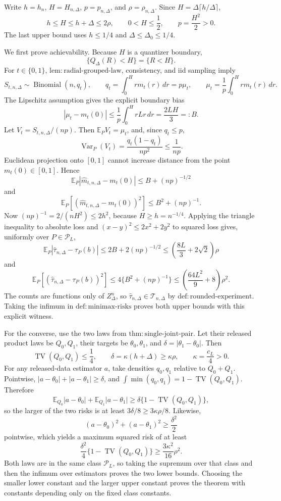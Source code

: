 Write \(h=h_n\), \(H=H_{n,\Delta}\), \(p=p_{n,\Delta}\), and \(\rho=\rho_{n,\Delta}\).  Since \(H=\Delta\lceil h/\Delta\rceil\),
\[
 h\le H\le h+\Delta\le2\rho,
 \qquad
 0<H\le\frac12,
 \qquad
 p=\frac{H^2}{2}>0.
\]
The last upper bound uses \(h\le1/4\) and \(\Delta\le\Delta_0\le1/4\).

We first prove achievability.  Because \(H\) is a quantizer boundary,
\[
 \{Q_\Delta(R)<H\}=\{R<H\}.
\]
For \(t\in\{0,1\}\), \(\mathrm{lem:radial\text{-}grouped\text{-}law}\), consistency, and iid sampling imply
\[
 S_{t,n,\Delta}\sim\operatorname{Binomial}(n,q_t),
 \qquad
 q_t=\int_0^H r m_t(r)\,dr=p\mu_t,
 \qquad
 \mu_t=\frac1p\int_0^H r m_t(r)\,dr.
\]
The Lipschitz assumption gives the explicit boundary bias
\[
 |\mu_t-m_t(0)|
 \le\frac1p\int_0^H rLr\,dr
 =\frac{2LH}{3}=:B.
\]
Let \(V_t=S_{t,n,\Delta}/(np)\).  Then \(\mathbb E_PV_t=\mu_t\), and, since \(q_t\le p\),
\[
 \operatorname{Var}_P(V_t)
 =\frac{q_t(1-q_t)}{np^2}
 \le\frac1{np}.
\]
Euclidean projection onto \([0,1]\) cannot increase distance from the point \(m_t(0)\in[0,1]\).  Hence
\[
 \mathbb E_P|\widehat m_{t,n,\Delta}-m_t(0)|
 \le B+(np)^{-1/2}
\]
and
\[
 \mathbb E_P[(\widehat m_{t,n,\Delta}-m_t(0))^2]
 \le B^2+(np)^{-1}.
\]
Now \((np)^{-1}=2/(nH^2)\le2h^2\), because \(H\ge h=n^{-1/4}\).  Applying the triangle inequality to absolute loss and \((x-y)^2\le2x^2+2y^2\) to squared loss gives, uniformly over \(P\in\mathcal P_L\),
\[
 \mathbb E_P|\widehat\tau_{n,\Delta}-\tau_P(b)|
 \le2B+2(np)^{-1/2}
 \le\left(\frac{8L}{3}+2\sqrt2\right)\rho
\]
and
\[
 \mathbb E_P[(\widehat\tau_{n,\Delta}-\tau_P(b))^2]
 \le4\{B^2+(np)^{-1}\}
 \le\left(\frac{64L^2}{9}+8\right)\rho^2.
\]
The counts are functions only of \(Z_\Delta^n\), so \(\widehat\tau_{n,\Delta}\in\mathcal T_{n,\Delta}\) by \(\mathrm{def:rounded\text{-}experiment}\).  Taking the infimum in \(\mathrm{def:minimax\text{-}risks}\) proves both upper bounds with this explicit witness.

For the converse, use the two laws from \(\mathrm{thm:single\text{-}joint\text{-}pair}\).  Let their released product laws be \(Q_0,Q_1\), their targets be \(\theta_0,\theta_1\), and \(\delta=|\theta_1-\theta_0|\).  Then
\[
 \operatorname{TV}(Q_0,Q_1)\le\frac14,
 \qquad
 \delta=\kappa(h+\Delta)\ge\kappa\rho,
 \qquad \kappa=\frac{c_L}{4}>0.
\]
For any released-data estimator \(a\), take densities \(q_0,q_1\) relative to \(Q_0+Q_1\).  Pointwise, \(|a-\theta_0|+|a-\theta_1|\ge\delta\), and \(\int\min(q_0,q_1)=1-\operatorname{TV}(Q_0,Q_1)\).  Therefore
\[
 \mathbb E_{Q_0}|a-\theta_0|+\mathbb E_{Q_1}|a-\theta_1|
 \ge\delta\{1-\operatorname{TV}(Q_0,Q_1)\},
\]
so the larger of the two risks is at least \(3\delta/8\ge3\kappa\rho/8\).  Likewise,
\[
 (a-\theta_0)^2+(a-\theta_1)^2\ge\frac{\delta^2}{2}
\]
pointwise, which yields a maximum squared risk of at least
\[
 \frac{\delta^2}{4}\{1-\operatorname{TV}(Q_0,Q_1)\}
 \ge\frac{3\kappa^2}{16}\rho^2.
\]
Both laws are in the same class \(\mathcal P_L\), so taking the supremum over that class and then the infimum over estimators proves the two lower bounds.  Choosing the smaller lower constant and the larger upper constant proves the theorem with constants depending only on the fixed class constants.